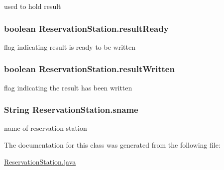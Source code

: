 used to hold result 

\hypertarget{classReservationStation_affeac0d7f9f9199919042bdb66ba2f73}{
\subsubsection[{result\-Ready}]{\setlength{\rightskip}{0pt plus 5cm}boolean {\bf \-Reservation\-Station.\-result\-Ready}}}\label{classReservationStation_affeac0d7f9f9199919042bdb66ba2f73}


flag indicating result is ready to be written 

\hypertarget{classReservationStation_af3a98e6cc1d9b79263ed8848295fa29c}{
\subsubsection[{result\-Written}]{\setlength{\rightskip}{0pt plus 5cm}boolean {\bf \-Reservation\-Station.\-result\-Written}}}\label{classReservationStation_af3a98e6cc1d9b79263ed8848295fa29c}


flag indicating the result has been written 

\hypertarget{classReservationStation_a2c0bd5b95f126395b0ab081394f090f6}{
\subsubsection[{sname}]{\setlength{\rightskip}{0pt plus 5cm}\-String {\bf \-Reservation\-Station.\-sname}}}\label{classReservationStation_a2c0bd5b95f126395b0ab081394f090f6}


name of reservation station 



\-The documentation for this class was generated from the following file\-:\begin{DoxyCompactItemize}
\item 
\hyperlink{ReservationStation_8java}{\-Reservation\-Station.\-java}\end{DoxyCompactItemize}

